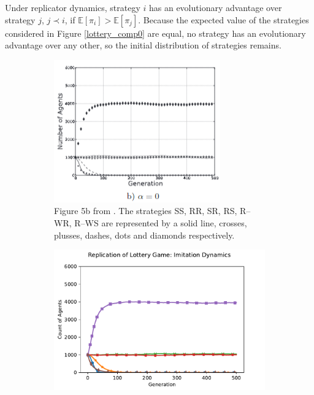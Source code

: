 \FloatBarrier
Under replicator dynamics, strategy $i$ has an evolutionary advantage over strategy $j$, $j \prec i$, if $\mathbb E [\pi_i] >\mathbb E [\pi_j]$. Because the expected value of the strategies considered in Figure \ref{lottery_comp0} are equal, no strategy has an evolutionary advantage over any other, so the initial distribution of strategies remains.
\FloatBarrier 
\begin{figure}[!h]
  \begin{subfigure}[b]{0.45\textwidth}
    \includegraphics[width=\textwidth]{images/lottery2.png}
    \caption{Figure 5b from \cite{RN30}. The strategies SS, RR, SR, RS, R--WR, R--WS are represented by a solid line, crosses, plusses, dashes, dots and diamonds respectively. }
    \label{lottery2}
  \end{subfigure}
  \hfill
  \begin{subfigure}[b]{0.45\textwidth}
    \includegraphics[width=1.25\textwidth]{images/lottery2_me.pdf}

\end{subfigure}
\end{figure}
